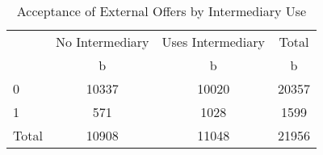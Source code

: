 \begin{table}[htbp]\centering
\def\sym#1{\ifmmode^{#1}\else\(^{#1}\)\fi}
\caption{Acceptance of External Offers by Intermediary Use}
\begin{tabular}{l*{3}{c}}
\hline\hline
            &No Intermediary&Uses Intermediary&       Total\\
            &           b&           b&           b\\
\hline
0           &       10337&       10020&       20357\\
1           &         571&        1028&        1599\\
Total       &       10908&       11048&       21956\\
\hline\hline
\end{tabular}
\end{table}
